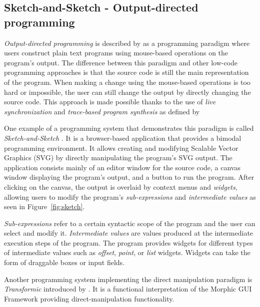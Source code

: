 \subsection{Sketch-and-Sketch - Output-directed programming}
\label{sec:odp}
\emph{Output-directed programming} is described by \citet{sketch-and-sketch} as
a programming paradigm where users construct plain text programs using mouse-based operations on the program's output.
The difference between this paradigm and other low-code programming approaches is that the source code is still the main representation of the program.
When making a change using the mouse-based operations is too hard or impossible, the user
can still change the output by directly changing the source code.
This approach is made possible thanks to the use of \emph{live synchronization} and \emph{trace-based program synthesis} as defined by \citet{output-directed-programming}

One example of a programming system that demonstrates this paradigm is called \emph{Sketch-and-Sketch} \cite{sketch-and-sketch,output-directed-programming}.
It is a browser-based application that provides a bimodal programming environment. It allows creating and modifying Scalable Vector Graphics (SVG) by directly manipulating the program's SVG output.
The application consists mainly of an editor window for the source code, a canvas window displaying the program's output, and a button to run the program.
After clicking on the canvas, the output is overlaid by context menus and \emph{widgets}, allowing users to modify the program's \emph{sub-expressions} and \emph{intermediate values} as seen in Figure~\ref{fig:sketch}.

\emph{Sub-expressions} refer to a certain syntactic scope of the program and the user can select and modify it.
\emph{Intermediate values} are values produced at the intermediate execution steps of the program.
The program provides widgets for different types of intermediate values such as \emph{offset}, \emph{point}, or \emph{list} widgets.
Widgets can take the form of draggable boxes or input fields.

Another programming system implementing the direct manipulation paradigm is \emph{Transformic} introduced by \citet{Schreiber_Krahn_Ingalls_Hirschfeld_2017}.
It is a functional interpretation of the Morphic GUI Framework providing direct-manipulation functionality.

